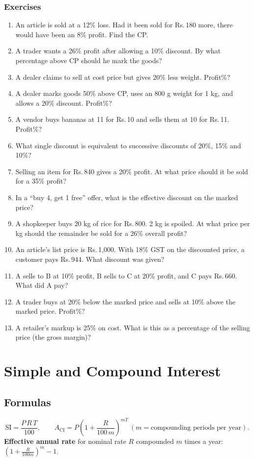 \documentclass[11pt,a4paper,openany]{report}
\newenvironment{exercises}{\subsection*{Exercises \thechapter}\begin{enumerate}[label=\textbf{\thechapter.\arabic*},leftmargin=3.2em]}{\end{enumerate}}
\newcommand{\Rs}{Rs.\,}
\begin{document}
\begin{exercises}
\item An article is sold at a 12\% loss. Had it been sold for \Rs180 more, there would have been an 8\% profit. Find the CP.
\item A trader wants a 26\% profit after allowing a 10\% discount. By what percentage above CP should he mark the goods?
\item A dealer claims to sell at cost price but gives 20\% less weight. Profit\%?
\item A dealer marks goods 50\% above CP, uses an 800 g weight for 1 kg, and allows a 20\% discount. Profit\%?
\item A vendor buys bananas at 11 for \Rs10 and sells them at 10 for \Rs11. Profit\%?
\item What single discount is equivalent to successive discounts of 20\%, 15\% and 10\%?
\item Selling an item for \Rs840 gives a 20\% profit. At what price should it be sold for a 35\% profit?
\item In a ``buy 4, get 1 free'' offer, what is the effective discount on the marked price?
\item A shopkeeper buys 20 kg of rice for \Rs800. 2 kg is spoiled. At what price per kg should the remainder be sold for a 26\% overall profit?
\item An article's list price is \Rs1,000. With 18\% GST on the discounted price, a customer pays \Rs944. What discount was given?
\item A sells to B at 10\% profit, B sells to C at 20\% profit, and C pays \Rs660. What did A pay?
\item A trader buys at 20\% below the marked price and sells at 10\% above the marked price. Profit\%?
\item A retailer's markup is 25\% on cost. What is this as a percentage of the selling price (the gross margin)?
\end{exercises}

\chapter{Simple and Compound Interest}\label{ch:si}

\section{Formulas}
\[\text{SI}=\frac{P\,R\,T}{100},\qquad A_{\text{CI}}=P\left(1+\frac{R}{100\,m}\right)^{mT}\ (m=\text{compounding periods per year}).\]
\textbf{Effective annual rate} for nominal rate $R$ compounded $m$ times a year: $\left(1+\frac R{100m}\right)^m-1$.
\end{document}
